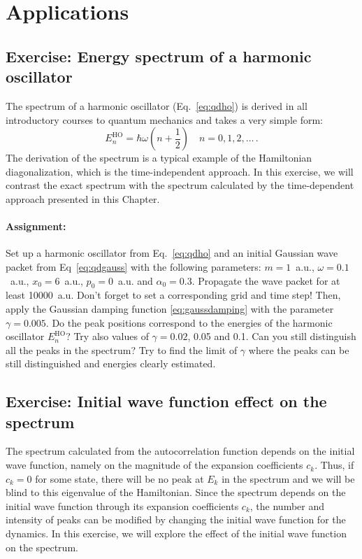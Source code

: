\section{Applications}

\subsection*{Exercise: Energy spectrum of a harmonic oscillator}

The spectrum of a harmonic oscillator (Eq.~\eqref{eq:qdho}) is derived in all introductory courses to quantum mechanics and takes a very simple form:
\begin{equation*}
    E_n^\mathrm{HO} = \hbar\omega\left(n+\frac{1}{2}\right) \quad n=0,1,2,\dots \, .
\end{equation*}
The derivation of the spectrum is a typical example of the Hamiltonian diagonalization, which is the time-independent approach. In this exercise, we will contrast the exact spectrum with the spectrum calculated by the time-dependent approach presented in this Chapter.

\paragraph{Assignment:} Set up a harmonic oscillator from Eq.~\eqref{eq:qdho} and an initial Gaussian wave packet from Eq~\eqref{eq:qdgauss} with the following parameters: $m=1$~a.u., $\omega=0.1$~a.u., $x_0=6$~a.u., $p_0=0$~a.u. and $\alpha_0 = 0.3$. Propagate the wave packet for at least 10000~a.u. Don't forget to set a corresponding grid and time step! Then, apply the Gaussian damping function \eqref{eq:gaussdamping} with the parameter $\gamma = 0.005$. Do the peak positions correspond to the energies of the harmonic oscillator $E_n^\mathrm{HO}$? Try also values of $\gamma=0.02$, 0.05 and 0.1. Can you still distinguish all the peaks in the spectrum? Try to find the limit of $\gamma$ where the peaks can be still distinguished and energies clearly estimated.

\subsection*{Exercise: Initial wave function effect on the spectrum}

The spectrum calculated from the autocorrelation function depends on the initial wave function, namely on the magnitude of the expansion coefficients $c_k$. Thus, if $c_k = 0$ for some state, there will be no peak at $E_k$ in the spectrum and we will be blind to this eigenvalue of the Hamiltonian. Since the spectrum depends on the initial wave function through its expansion coefficients $c_k$, the number and intensity of peaks can be modified by changing the initial wave function for the dynamics. In this exercise, we will explore the effect of the initial wave function on the spectrum. 

